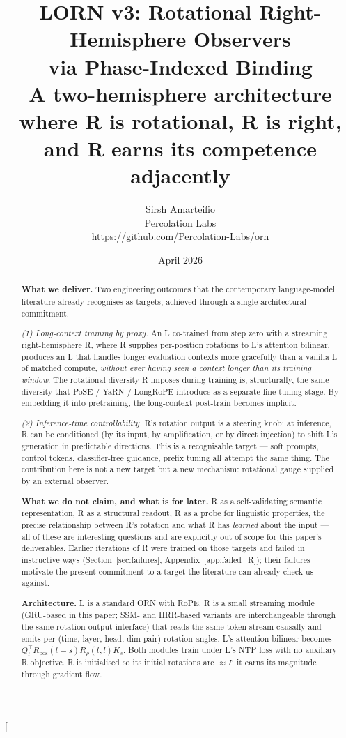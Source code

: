 \documentclass[10pt, twocolumn, a4paper]{article}
\title{\vspace{-1cm}\textbf{LORN v3: Rotational Right-Hemisphere Observers\\via Phase-Indexed Binding}\\[2pt]
\large A two-hemisphere architecture where R is rotational, R is right, and R earns its competence adjacently}
\author{%
    Sirsh Amarteifio\\
    {\small Percolation Labs}\\
    {\small \url{https://github.com/Percolation-Labs/orn}}%
}
\date{April 2026}
\begin{document}
\twocolumn[\maketitle
\begin{abstract}
\noindent
\textbf{What we deliver.} Two engineering outcomes that the contemporary language-model literature already recognises as targets, achieved through a single architectural commitment.

\emph{(1) Long-context training by proxy.} An L co-trained from step zero with a streaming right-hemisphere R, where R supplies per-position rotations to L's attention bilinear, produces an L that handles longer evaluation contexts more gracefully than a vanilla L of matched compute, \emph{without ever having seen a context longer than its training window}. The rotational diversity R imposes during training is, structurally, the same diversity that PoSE / YaRN / LongRoPE introduce as a separate fine-tuning stage. By embedding it into pretraining, the long-context post-train becomes implicit.

\emph{(2) Inference-time controllability.} R's rotation output is a steering knob: at inference, R can be conditioned (by its input, by amplification, or by direct injection) to shift L's generation in predictable directions. This is a recognisable target --- soft prompts, control tokens, classifier-free guidance, prefix tuning all attempt the same thing. The contribution here is not a new target but a new mechanism: rotational gauge supplied by an external observer.

\textbf{What we do not claim, and what is for later.} R as a self-validating semantic representation, R as a structural readout, R as a probe for linguistic properties, the precise relationship between R's rotation and what R has \emph{learned} about the input --- all of these are interesting questions and are explicitly out of scope for this paper's deliverables. Earlier iterations of R were trained on those targets and failed in instructive ways (Section~\ref{sec:failures}, Appendix~\ref{app:failed_R}); their failures motivate the present commitment to a target the literature can already check us against.

\textbf{Architecture.} L is a standard ORN with RoPE. R is a small streaming module (GRU-based in this paper; SSM- and HRR-based variants are interchangeable through the same rotation-output interface) that reads the same token stream causally and emits per-(time, layer, head, dim-pair) rotation angles. L's attention bilinear becomes $Q_t^\top R_{\text{pos}}(t-s) R_\rho(t, l) K_s$. Both modules train under L's NTP loss with no auxiliary R objective. R is initialised so its initial rotations are $\approx I$; it earns its magnitude through gradient flow.


\end{abstract}
\end{document}

